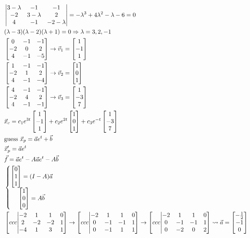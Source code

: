 \documentclass[11pt, fleqn]{article}
\begin{document}
\begin{align*}
    &\detmatrix{3-\lambda&-1&-1\\-2&3-\lambda&2\\4&-1&-2-\lambda}=-\lambda^3+4\lambda^2-\lambda-6=0\\
    &(\lambda-3)(\lambda-2)(\lambda+1)=0\Ra \lambda=3,2,-1\\
    &\matrixx{0&-1&-1\\-2&0&2\\4&-1&-5}\to\vec{v}_1=\matrixx{1\\-1\\1}\\
    &\matrixx{1&-1&-1\\-2&1&2\\4&-1&-4}\to\vec{v}_2=\matrixx{1\\0\\1}\\
    &\matrixx{4&-1&-1\\-2&4&2\\4&-1&-1}\to\vec{v}_3=\matrixx{1\\-3\\7}\\
    &\vec{x}_c=c_1e^{3t}\matrixx{1\\-1\\1}+c_2e^{2t}\matrixx{1\\0\\1}+c_3e^{-t}\matrixx{1\\-3\\7}\\
    &\text{guess }\vec{x}_p=\vec{a} e^{t}+\vec{b}\\
    &\vec{x}_p'=\vec{a} e^t\\
    &\vec{f}=\vec{a} e^t-A\vec{a} e^t-A\vec{b}\\
    &\eqnsystem{\matrixx{0\\1\\1}=(I-A)\vec{a}\\\matrixx{1\\0\\0}=A\vec{b}}\\
    &\augmatrix{ccc}{-2&1&1&0\\2&-2&-2&1\\-4&1&3&1}\to\augmatrix{ccc}{-2&1&1&0\\0&-1&-1&1\\0&-1&1&1}\to\augmatrix{ccc}{-2&1&1&0\\0&-1&-1&1\\0&-2&0&2}\leadsto\vec{a}=\matrixx{-\frac{1}{2}\\-1\\0}\\

\end{align*}
\end{document}

